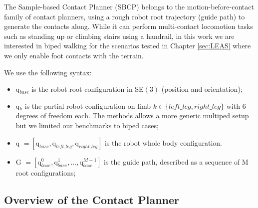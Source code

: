 The Sample-based Contact Planner (SBCP) \cite{AcyclicCP} belongs to the motion-before-contact family of contact planners, using a rough robot root trajectory (guide path) to generate the contacts along.
While it can perform multi-contact locomotion tasks such as standing up or climbing stairs using a handrail, in this work we are interested in biped walking for the scenarios tested in Chapter \ref{sec:LEAS} where we only enable foot contacts with the terrain.

\newpage

We use the following syntax:
\begin{itemize}
    \item q$_{base}$ is the robot root configuration in SE$(3)$ (position and orientation);
    \item q$_k$ is the partial robot configuration on limb $k\in\{left\_leg, right\_leg\}$ with 6 degrees of freedom each. The methods allows a more generic multiped setup but we limited our benchmarks to biped cases;
    \item q $= [\mbox{q}_{base},\mbox{q}_{left\_leg},\mbox{q}_{right\_leg}]$ is the robot whole body configuration.
    \item G $ = [\mbox{q}_{base}^0,\mbox{q}_{base}^1,..., \mbox{q}_{base}^{M-1}]$ is the guide path, described as a sequence of M root configurations;
\end{itemize}



\subsection{Overview of the Contact Planner}

